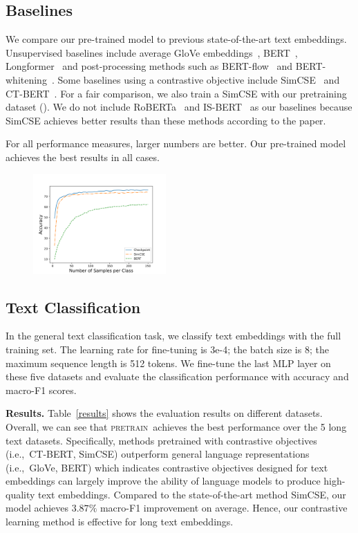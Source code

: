 \documentclass[11pt]{article}
\newcommand{\todo}[1]{{\color{red}{#1}}}
\newcommand{\our}{\mbox{\textsc{pretrain}}}
\begin{document}
\subsection{Baselines}
We compare our pre-trained model to previous state-of-the-art text embeddings. 
Unsupervised baselines include average GloVe embeddings~\cite{pennington-etal-2014-glove}, BERT~\cite{Devlin2019BERTPO}, Longformer~\cite{Beltagy2020LongformerTL} and post-processing methods such as BERT-flow~\cite{Li2020OnTS} and BERT-whitening~\cite{Su2021WhiteningSR}. 
Some baselines using a contrastive objective include SimCSE~\cite{Gao2021SimCSESC} and CT-BERT~\cite{Carlsson2021SemanticRW}. 
For a fair comparison, we also train a SimCSE with our pretraining dataset (\todo{SimCSE$_\mathrm{long}$}). 
We do not include RoBERTa~\cite{Liu2019RoBERTaAR} and IS-BERT~\cite{Zhang2020AnUS} as our baselines because SimCSE achieves better results than these methods according to the paper.

\begin{table}
    \centering
    
    \caption{For all performance measures, larger numbers are better. Our pre-trained model achieves the best results in all cases.}
    \label{results}
\end{table}

\begin{figure}
\includegraphics[width=\columnwidth,height=1.5in]{fig/few_shot.png}
\caption{
}  
\label{few_shot}
\end{figure}

\subsection{Text Classification}
In the general text classification task, we classify text embeddings with the full training set. 
The learning rate for fine-tuning is 3e-4; the batch size is 8; the maximum sequence length is 512 tokens. 
We fine-tune the last MLP layer on these five datasets and evaluate the classification performance with accuracy and macro-F1 scores.

\textbf{Results.}
Table~\ref{results} shows the evaluation results on different datasets. 
Overall, we can see that \our~achieves the best performance over the 5 long text datasets. 
Specifically, methods pretrained with contrastive objectives (i.e.,~CT-BERT, SimCSE) outperform general language representations (i.e.,~GloVe, BERT) which indicates contrastive objectives designed for text embeddings can largely improve the ability of language models to produce high-quality text embeddings. 
Compared to the state-of-the-art method SimCSE, our model achieves $3.87\%$ macro-F1 improvement on average. Hence, our contrastive learning method is effective for long text embeddings.
\end{document}
